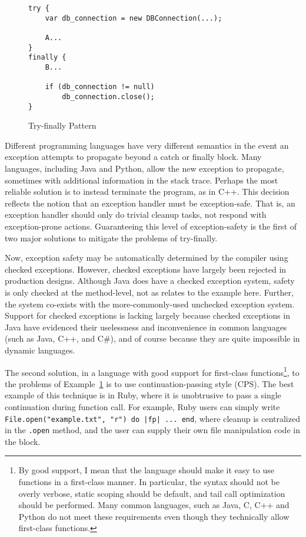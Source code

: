 \documentclass[11pt]{article}
\begin{document}
\begin{figure}[h]
\caption{Try-finally Pattern}
\label{tryPattern}
\begin{verbatim}
try {  
    var db_connection = new DBConnection(...);

    A...
}
finally {
    B...

    if (db_connection != null)
        db_connection.close();
}
\end{verbatim}
\end{figure}

Different programming languages have very different semantics in the event an exception attempts to propagate beyond a catch or finally block.
Many languages, including Java and Python, allow the new exception to propagate, sometimes with additional information in the stack trace.
Perhaps the most reliable solution is to instead terminate the program, as in C++.\cite{evolutionCplusplus}
This decision reflects the notion that an exception handler must be exception-safe.
That is, an exception handler should only do trivial cleanup tasks, not respond with exception-prone actions.
Guaranteeing this level of exception-safety is the first of two major solutions to mitigate the problems of try-finally.

Now, exception safety may be automatically determined by the compiler using checked exceptions.
However, checked exceptions have largely been rejected in production designs.
Although Java does have a checked exception system, safety is only checked at the method-level, not as relates to the example here.
Further, the system co-exists with the more-commonly-used unchecked exception system.
Support for checked exceptions is lacking largely because checked exceptions in Java have evidenced their uselessness and inconvenience in common languages (such as Java, C++, and C\#), and of course because they are quite impossible in dynamic languages.

The second solution, in a language with good support for first-class functions\footnote{By good support, I mean that the language should make it easy to use functions in a first-class manner. In particular, the syntax should not be overly verbose, static scoping should be default, and tail call optimization should be performed. Many common languages, such as Java, C, C++ and Python do not meet these requirements even though they technically allow first-class functions.}, to the problems of Example~\ref{tryPattern} is to use continuation-passing style (CPS).
The best example of this technique is in Ruby, where it is unobtrusive to pass a single continuation during function call.
For example, Ruby users can simply write \texttt{File.open("example.txt", "r") do |fp| ... end}, where cleanup is centralized in the \texttt{.open} method, and the user can supply their own file manipulation code in the block.\cite{programmingRuby}
\end{document}
